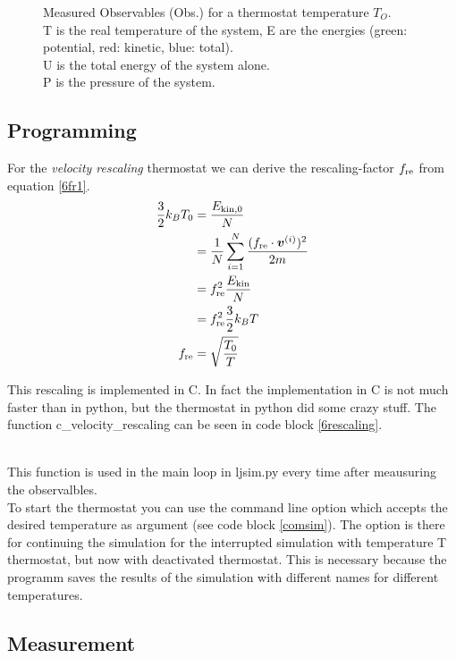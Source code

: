 \begin{figure}[ht]
\caption{
Measured Observables (Obs.) for a thermostat temperature $T_O$.\\
T is the real temperature of the system, E are the energies (green: potential, red: kinetic, blue: total).\\
U is the total energy of the system alone.\\
P is the pressure of the system.}
\label{fig4}
\end{figure}

\subsection*{Programming}

For the \emph{velocity rescaling} thermostat we can derive the rescaling-factor $f_\text{re}$ from equation \eqref{6fr1}.
\begin{align}
\frac{3}{2}k_BT_0
	&= \frac{E_{\text{kin},0}}{N}
	\label{6fr1}\\
&= \frac{1}{N}\sum_{i=1}^{N} \frac{(f_\text{re}\cdot\boldsymbol{v}^{(i)})^2}{2m}
	\label{6fr2}\\
&= f_\text{re}^2\frac{E_\text{kin}}{N}
	\label{6fr3}\\
&=f_\text{re}^2\frac{3}{2}k_BT
	\label{6fr4}\\
f_\text{re}
	&= \sqrt{\frac{T_0}{T}}
	\label{6r5}
\end{align}

This rescaling is implemented in C. In fact the implementation in C is not much faster than in python, but the thermostat in python did some crazy stuff.
The function c\_velocity\_rescaling can be seen in code block \ref{6rescaling}.\\
\ \\


This function is used in the main loop in ljsim.py every time after meausuring the observalbles.\\

To start the thermostat you can use the command line option  which accepts the desired temperature as argument (see code block \ref{comsim}).
The option  is there for continuing the simulation for the interrupted simulation with temperature T thermostat, but now with deactivated thermostat.
This is necessary because the programm saves the results of the simulation with different names for different temperatures.

\subsection*{Measurement}

